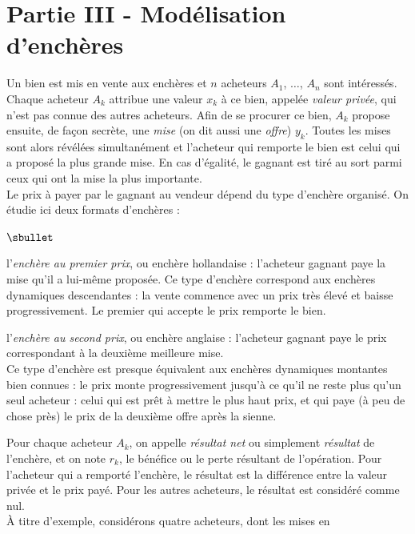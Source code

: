 \newpage



\section*{Partie III - Modélisation d'enchères}

\noindent
Un bien est mis en vente aux enchères et $n$ acheteurs $A_1$, $\ldots$,
$A_n$ sont intéressés. Chaque acheteur $A_k$ attribue une valeur $x_k$ 
à ce bien, appelée \emph{valeur privée}, qui n'est pas connue des 
autres acheteurs. Afin de se procurer ce bien, $A_k$ propose ensuite, 
de façon secrète, une \emph{mise} (on dit aussi une \emph{offre}) 
$y_k$. Toutes les mises sont alors révélées simultanément et l'acheteur 
qui remporte le bien est celui qui a proposé la plus grande mise. En 
cas d'égalité, le gagnant est tiré au sort parmi ceux qui ont la mise 
la plus importante.\\
Le prix à payer par le gagnant au vendeur dépend du type d'enchère 
organisé. On étudie ici deux formats d'enchères :
\begin{noliste}{$\sbullet$}
  \item l'\emph{enchère au premier prix}, ou enchère hollandaise : 
  l'acheteur gagnant paye la mise qu'il a lui-même proposée. Ce type 
  d'enchère correspond aux enchères dynamiques \og descendantes \fg{} :
  la vente commence avec un prix très élevé et baisse progressivement.
  Le premier qui accepte le prix remporte le bien.
  
  \item l'\emph{enchère au second prix}, ou enchère anglaise : 
  l'acheteur gagnant paye le prix correspondant à la deuxième meilleure
  mise.\\
  Ce type d'enchère est presque équivalent aux enchères dynamiques \og
  montantes \fg{} bien connues : le prix monte progressivement 
  jusqu'à ce qu'il ne reste plus qu'un seul acheteur : celui qui est 
  prêt à mettre le plus haut prix, et qui paye (à peu de chose près) le
  prix de la deuxième offre après la sienne.
\end{noliste}
Pour chaque acheteur $A_k$, on appelle \emph{résultat net} ou 
simplement \emph{résultat} de l'enchère, et on note $r_k$, le bénéfice 
ou le perte résultant de l'opération. Pour l'acheteur qui a remporté 
l'enchère, le résultat est la différence entre la valeur privée et le 
prix payé. Pour les autres acheteurs, le résultat est considéré comme 
nul.\\
À titre d'exemple, considérons quatre acheteurs, dont les mises en 
